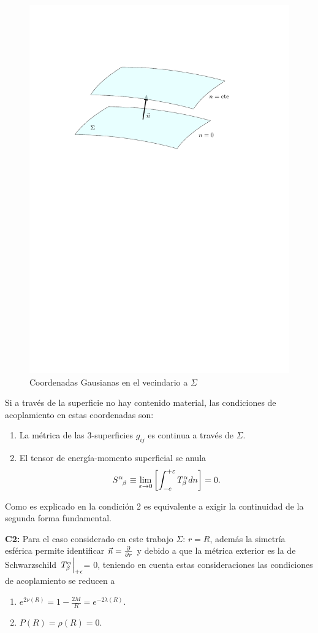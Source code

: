  \begin{figure}%
     \centering
     \includegraphics[width=0.7\linewidth]{figures/Junction.pdf}
     \caption{Coordenadas Gausianas en el vecindario a $\Sigma$}
     \label{JC}
 \end{figure}
Si a través de la superficie no hay contenido material, las condiciones de acoplamiento en estas coordenadas son:
 \begin{enumerate}[leftmargin=2cm]
     \item La métrica de las 3-superficies $g_{ij}$ es continua a través de $\Sigma$.
     \item El tensor de energía-momento superficial se anula
     \begin{equation}
\tensor{S}{^\alpha_\beta}\equiv\lim _{\varepsilon \rightarrow 0}\left[\int_{-e}^{+\varepsilon} T_{\beta}^{\alpha} d n\right]=0.
    \end{equation}
 \end{enumerate}

 Como es explicado en \cite{Misner1973} la condición 2 es equivalente a exigir la continuidad de la segunda forma fundamental. 
 
 \textbf{C2:} Para el caso considerado en este trabajo $\Sigma:\,r=R$, además la simetría esférica permite identificar $\vec{n}=\pdv{r}$ y debido a que la métrica exterior es la de Schwarzschild $\eval{T^{\alpha}_{\beta}}_{+\epsilon}$= 0, teniendo en cuenta estas consideraciones las condiciones de acoplamiento se reducen a
 \begin{enumerate}[leftmargin=2cm]
     \item $e ^ {  2 \nu(R) } =  1 - \frac { 2 M } { R }= e ^ { -2 \lambda(R) }$.
    \item $P(R)=\rho(R)=0$.
 \end{enumerate}


